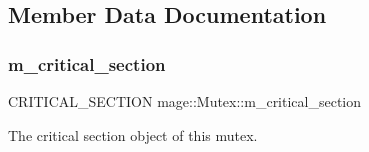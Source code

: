 \subsection{Member Data Documentation}
\hypertarget{classmage_1_1_mutex_a18414337aef28b7ed261e7a805d2c103}{}\label{classmage_1_1_mutex_a18414337aef28b7ed261e7a805d2c103} 
\subsubsection{\texorpdfstring{m\+\_\+critical\+\_\+section}{m\_critical\_section}}
{\footnotesize\ttfamily C\+R\+I\+T\+I\+C\+A\+L\+\_\+\+S\+E\+C\+T\+I\+ON mage\+::\+Mutex\+::m\+\_\+critical\+\_\+section\hspace{0.3cm}{\ttfamily [private]}}

The critical section object of this mutex. 